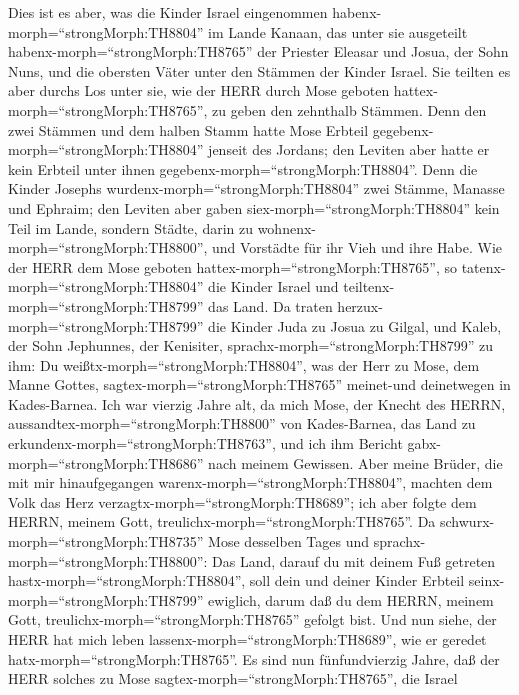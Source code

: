  Dies ist es aber, was die Kinder Israel eingenommen
habenx-morph=``strongMorph:TH8804'' im Lande Kanaan, das unter sie
ausgeteilt habenx-morph=``strongMorph:TH8765'' der Priester Eleasar und
Josua, der Sohn Nuns, und die obersten Väter unter den Stämmen der
Kinder Israel.  Sie teilten es aber durchs Los unter sie,
wie der HERR durch Mose geboten hattex-morph=``strongMorph:TH8765'', zu
geben den zehnthalb Stämmen.  Denn den zwei Stämmen und dem
halben Stamm hatte Mose Erbteil gegebenx-morph=``strongMorph:TH8804''
jenseit des Jordans; den Leviten aber hatte er kein Erbteil unter ihnen
gegebenx-morph=``strongMorph:TH8804''.  Denn die Kinder
Josephs wurdenx-morph=``strongMorph:TH8804'' zwei Stämme, Manasse und
Ephraim; den Leviten aber gaben siex-morph=``strongMorph:TH8804'' kein
Teil im Lande, sondern Städte, darin zu
wohnenx-morph=``strongMorph:TH8800'', und Vorstädte für ihr Vieh und
ihre Habe.  Wie der HERR dem Mose geboten
hattex-morph=``strongMorph:TH8765'', so
tatenx-morph=``strongMorph:TH8804'' die Kinder Israel und
teiltenx-morph=``strongMorph:TH8799'' das Land.  Da traten
herzux-morph=``strongMorph:TH8799'' die Kinder Juda zu Josua zu Gilgal,
und Kaleb, der Sohn Jephunnes, der Kenisiter,
sprachx-morph=``strongMorph:TH8799'' zu ihm: Du
weißtx-morph=``strongMorph:TH8804'', was der Herr zu Mose, dem Manne
Gottes, sagtex-morph=``strongMorph:TH8765'' meinet-und deinetwegen in
Kades-Barnea.  Ich war vierzig Jahre alt, da mich Mose, der
Knecht des HERRN, aussandtex-morph=``strongMorph:TH8800'' von
Kades-Barnea, das Land zu erkundenx-morph=``strongMorph:TH8763'', und
ich ihm Bericht gabx-morph=``strongMorph:TH8686'' nach meinem Gewissen.
 Aber meine Brüder, die mit mir hinaufgegangen
warenx-morph=``strongMorph:TH8804'', machten dem Volk das Herz
verzagtx-morph=``strongMorph:TH8689''; ich aber folgte dem HERRN, meinem
Gott, treulichx-morph=``strongMorph:TH8765''.  Da
schwurx-morph=``strongMorph:TH8735'' Mose desselben Tages und
sprachx-morph=``strongMorph:TH8800'': Das Land, darauf du mit deinem Fuß
getreten hastx-morph=``strongMorph:TH8804'', soll dein und deiner Kinder
Erbteil seinx-morph=``strongMorph:TH8799'' ewiglich, darum daß du dem
HERRN, meinem Gott, treulichx-morph=``strongMorph:TH8765'' gefolgt bist.
 Und nun siehe, der HERR hat mich leben
lassenx-morph=``strongMorph:TH8689'', wie er geredet
hatx-morph=``strongMorph:TH8765''. Es sind nun fünfundvierzig Jahre, daß
der HERR solches zu Mose sagtex-morph=``strongMorph:TH8765'', die Israel
